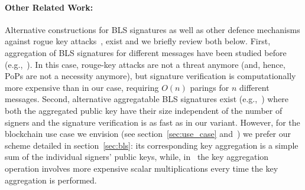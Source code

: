 \paragraph{Other Related Work:} Alternative constructions for BLS signatures as well as other defence mechanisms against 
rogue key attacks~\cite{proofs_of_posession}, exist and we briefly review both below. First, aggregation of BLS signatures for different messages have been studied before
(e.g.,~\cite{aggregate_BLS_signatures}). In this case, rouge-key attacks are not a threat anymore (and, hence, PoPs are not a necessity anymore), 
but signature verification is computationally more expensive than in our case, requiring $O(n)$ parings for $n$ different messages. Second, alternative aggregatable 
BLS signatures exist (e.g.,~\cite{boneh_compact_multisig}) where both the aggregated public key have their size independent 
of the number of signers and the signature verification is as fast as in our variant. However, for the blockchain use case we envision 
(see section~\ref{sec:use_case} and~\cite{ourLC}) we prefer our scheme detailed in section~\ref{sec:bls}: its corresponding key aggregation is a simple sum 
of the individual signers' public keys, while, in~\cite{boneh_compact_multisig} the key aggregation operation involves more expensive scalar 
multiplications every time the key aggregation is performed. 


